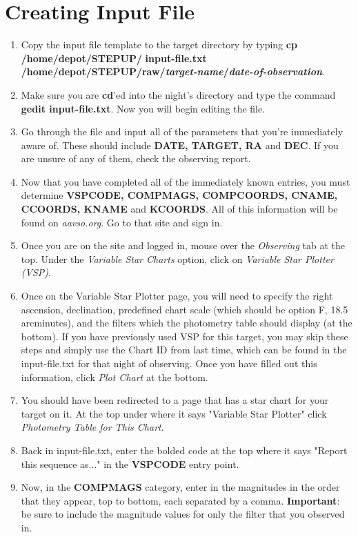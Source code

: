 \documentclass[11pt]{report}
\begin{document}
\section{Creating Input File}
\begin{enumerate}
\item Copy the input file template to the target directory by typing {\bf cp /home/depot/STEPUP/} {\bf input-file.txt /home/depot/STEPUP/raw/\emph{target-name}/\emph{date-of-observation}}. 
\item Make sure you are {\bf cd}'ed into the night's directory and type the command {\bf gedit input-file.txt}. Now you will begin editing the file.
\item Go through the file and input all of the parameters that you're immediately aware of. These should include {\bf DATE, TARGET, RA} and {\bf DEC}. If you are unsure of any of them, check the observing report.
\item Now that you have completed all of the immediately known entries, you must determine {\bf VSPCODE, COMPMAGS, COMPCOORDS, CNAME, CCOORDS, KNAME} and {\bf KCOORDS}. All of this information will be found on \emph{aavso.org}. Go to that site and sign in. 
\item Once you are on the site and logged in, mouse over the \emph{Observing} tab at the top. Under the \emph{Variable Star Charts} option, click on \emph{Variable Star Plotter (VSP)}. 
\item Once on the Variable Star Plotter page, you will need to specify the right ascension, declination, predefined chart scale (which should be option F, 18.5 arcminutes), and the filters which the photometry table should display (at the bottom). If you have previously used VSP for this target, you may skip these steps and simply use the Chart ID from last time, which can be found in the input-file.txt for that night of observing. Once you have filled out this information, click \emph{Plot Chart} at the bottom.
\item You should have been redirected to a page that has a star chart for your target on it. At the top under where it says "Variable Star Plotter" click \emph{Photometry Table for This Chart}.
\item Back in input-file.txt, enter the bolded code at the top where it says "Report this sequence as..." in the {\bf VSPCODE} entry point.
\item Now, in the {\bf COMPMAGS} category, enter in the magnitudes in the order that they appear, top to bottom, each separated by a comma. \textbf{Important}: be sure to include the magnitude values for only the filter that you observed in.

\end{enumerate}
\end{document}
